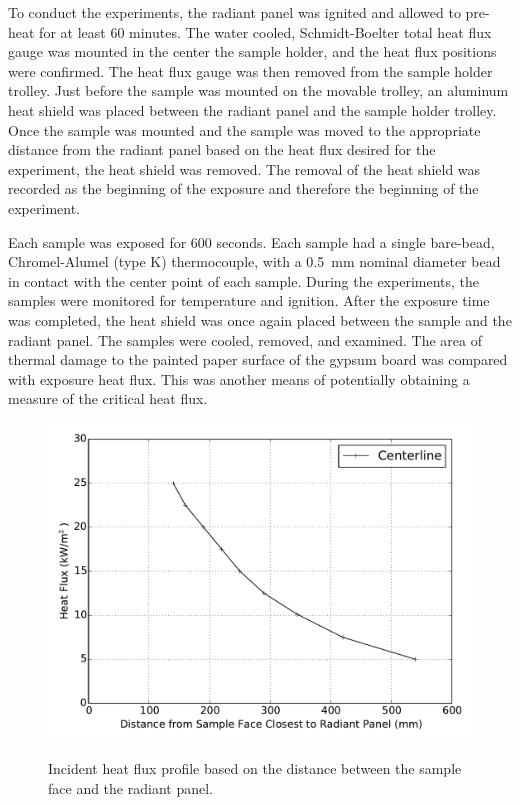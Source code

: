 \documentclass[twoside]{uocthesis}
\begin{document}
{To conduct the experiments, the radiant panel was ignited and allowed to pre-heat for at least 60 minutes.  The water cooled, Schmidt-Boelter total heat flux gauge was mounted in the center the sample holder, and the heat flux positions were confirmed. The heat flux gauge was then removed from the sample holder trolley. Just before the sample was mounted on the movable trolley, an aluminum heat shield was placed between the radiant panel and the sample holder trolley.  Once the sample was mounted and the sample was moved to the appropriate distance from the radiant panel based on the heat flux desired for the experiment, the heat shield was removed.  The removal of the heat shield was recorded as the beginning of the exposure and therefore the beginning of the experiment.   

Each sample was exposed for 600 seconds. Each sample had a single bare-bead, Chromel-Alumel (type K) thermocouple, with a 0.5~mm nominal diameter bead in contact with the center point of each sample. During the experiments, the samples were monitored for temperature and ignition. After the exposure time was completed, the heat shield was once again placed between the sample and the radiant panel.  The samples were cooled, removed, and examined.  The area of thermal damage to the painted paper surface of the gypsum board was compared with exposure heat flux.  This was another means of potentially obtaining a measure of the critical heat flux.  

\begin{figure}
	\centering
	\includegraphics[width=\textwidth]{../Figures/Rad_Panel_Cal} \\
	\caption[Incident heat flux profile based on the distance between the sample face and the radiant panel.]{Incident heat flux profile based on the distance between the sample face and the radiant panel.}
	\label{Rad_Panel_Cal}
\end{figure}

}
\end{document}
